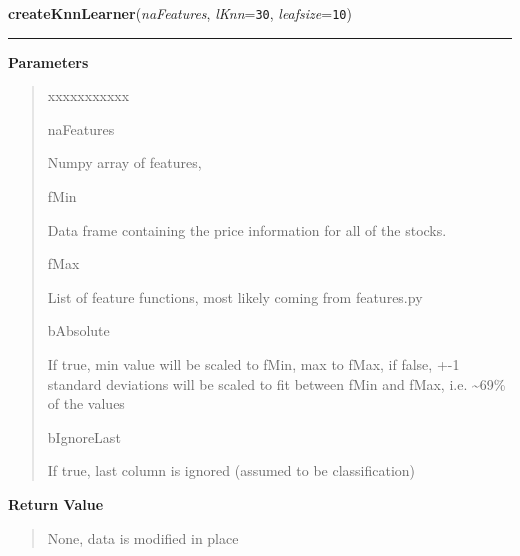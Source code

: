 \hspace{.8\funcindent}\begin{boxedminipage}{\funcwidth}

    \raggedright \textbf{createKnnLearner}(\textit{naFeatures}, \textit{lKnn}={\tt 30}, \textit{leafsize}={\tt 10})

    \vspace{-1.5ex}

    \rule{\textwidth}{0.5\fboxrule}
\setlength{\parskip}{2ex}
\setlength{\parskip}{1ex}
      \textbf{Parameters}
      \vspace{-1ex}

      \begin{quote}
        \begin{Ventry}{xxxxxxxxxxx}

          \item[naFeatures]

          Numpy array of features,

          \item[fMin]

          Data frame containing the price information for all of the 
          stocks.

          \item[fMax]

          List of feature functions, most likely coming from features.py

          \item[bAbsolute]

          If true, min value will be scaled to fMin, max to fMax, if false,
          +-1 standard deviations will be scaled to fit between fMin and 
          fMax, i.e. {\textasciitilde}69\% of the values

          \item[bIgnoreLast]

          If true, last column is ignored (assumed to be classification)

        \end{Ventry}

      \end{quote}

      \textbf{Return Value}
    \vspace{-1ex}

      \begin{quote}
      None, data is modified in place

      \end{quote}

    \end{boxedminipage}

